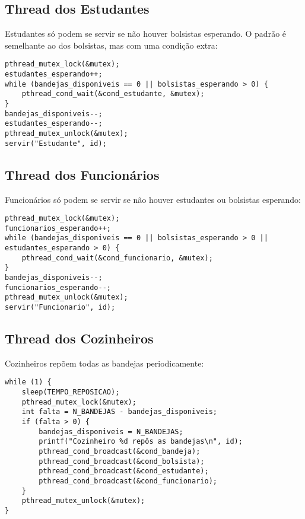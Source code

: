 \documentclass[10pt,a4paper]{article}
\begin{document}
\subsection{Thread dos Estudantes}

Estudantes só podem se servir se não houver bolsistas esperando. O padrão é semelhante ao dos bolsistas, mas com uma condição extra:

\begin{verbatim}
pthread_mutex_lock(&mutex);
estudantes_esperando++;
while (bandejas_disponiveis == 0 || bolsistas_esperando > 0) {
    pthread_cond_wait(&cond_estudante, &mutex);
}
bandejas_disponiveis--;
estudantes_esperando--;
pthread_mutex_unlock(&mutex);
servir("Estudante", id);
\end{verbatim}

\subsection{Thread dos Funcionários}

Funcionários só podem se servir se não houver estudantes ou bolsistas esperando:

\begin{verbatim}
pthread_mutex_lock(&mutex);
funcionarios_esperando++;
while (bandejas_disponiveis == 0 || bolsistas_esperando > 0 || estudantes_esperando > 0) {
    pthread_cond_wait(&cond_funcionario, &mutex);
}
bandejas_disponiveis--;
funcionarios_esperando--;
pthread_mutex_unlock(&mutex);
servir("Funcionario", id);
\end{verbatim}

\subsection{Thread dos Cozinheiros}

Cozinheiros repõem todas as bandejas periodicamente:

\begin{verbatim}
while (1) {
    sleep(TEMPO_REPOSICAO);
    pthread_mutex_lock(&mutex);
    int falta = N_BANDEJAS - bandejas_disponiveis;
    if (falta > 0) {
        bandejas_disponiveis = N_BANDEJAS;
        printf("Cozinheiro %d repôs as bandejas\n", id);
        pthread_cond_broadcast(&cond_bandeja);
        pthread_cond_broadcast(&cond_bolsista);
        pthread_cond_broadcast(&cond_estudante);
        pthread_cond_broadcast(&cond_funcionario);
    }
    pthread_mutex_unlock(&mutex);
}
\end{verbatim}
\end{document}
